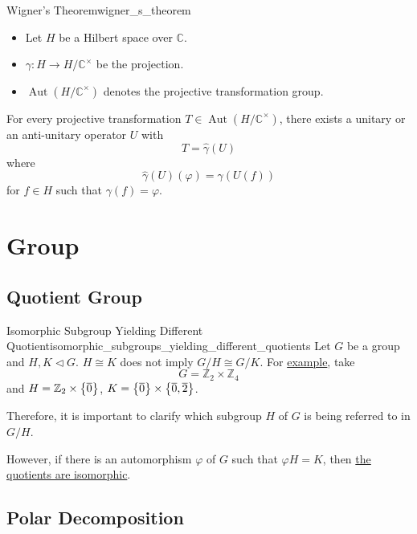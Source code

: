 \documentclass{article}
\begin{document}
\begin{theorem}{Wigner's Theorem}{wigner_s_theorem}
    \begin{itemize}
        \item Let $H$ be a Hilbert space over $\mathbb{C}$.
        \item $\gamma: H\rightarrow H/\mathbb{C}^\times$ be the projection.
        \item $\operatorname{Aut}(H/\mathbb{C}^\times)$ denotes the projective transformation group.
    \end{itemize}
    For every projective transformation $T\in \operatorname{Aut}(H/\mathbb{C}^\times)$, there exists a unitary or an anti-unitary operator $U$ with
    \[ T = \hat{\gamma}(U) \]
    where
    \[ \hat{\gamma}(U)(\varphi) = \gamma(U(f)) \]
    for $f\in H$ such that $\gamma(f) = \varphi$.
\end{theorem}

\section{Group}

\subsection{Quotient Group}

\begin{counterexample}{Isomorphic Subgroup Yielding Different Quotient}{isomorphic_subgroups_yielding_different_quotients}
    Let $G$ be a group and $H,K\vartriangleleft G$.
    $H\cong K$ does not imply $G/H \cong G/K$.
    For \href{https://math.stackexchange.com/questions/40763/isomorphic-quotient-groups/}{example}, take
    \[ G = \mathbb{Z}_2 \times \mathbb{Z}_4 \]
    and $H = \mathbb{Z}_2 \times \qty{\overline{0}}$, $K = \qty{\overline{0}} \times \qty{\overline{0}, \overline{2}}$.
\end{counterexample}

Therefore, it is important to clarify which subgroup $H$ of $G$ is being referred to in $G/H$.
\par
However, if there is an automorphism $\varphi$ of $G$ such that $\varphi{H} = K$, then \href{https://math.stackexchange.com/questions/40881/isomorphic-quotients-by-isomorphic-normal-subgroups}{the quotients are isomorphic}.

\subsection{Polar Decomposition}
\end{document}
